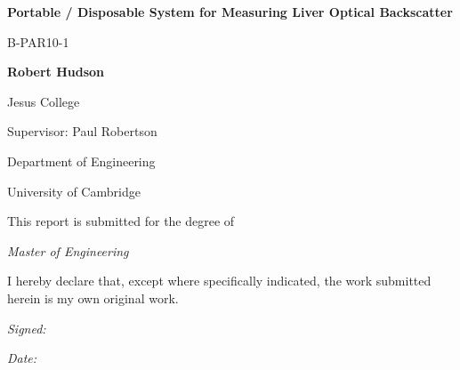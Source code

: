 \begin{titlepage}
    \begin{centering}
        \vspace{1cm}
        {\huge\bfseries Portable / Disposable System for Measuring Liver Optical Backscatter\par}
        \vspace{0.5cm}
        {\Large B-PAR10-1}\par
        \vspace{1cm}
        \vspace{1cm}
        {\Large\bfseries Robert Hudson}\par
        {\Large
        Jesus College\par
        \vspace{1cm}
        Supervisor: Paul Robertson\par
        \vspace{1cm}
        Department of Engineering \par
        University of Cambridge \par
        \vspace{1cm}
        This report is submitted for the degree of \par
        {\em Master of Engineering}
        }

    \end{centering}
    \vfill

    {\footnotesize \noindent I hereby declare that, except where specifically indicated, the work submitted herein is my own original work.}\par
    \vspace{0.5cm}
    \begin{minipage}[t]{0.5\linewidth}
        {\small\textit{Signed:}\hrulefill}
    \end{minipage}
    \hfill
    \begin{minipage}[t]{0.3\linewidth}
        {\small\textit{Date:}}%
    \end{minipage}

\end{titlepage}